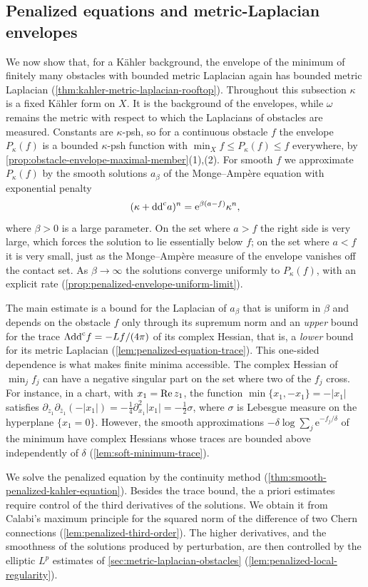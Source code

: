 \subsection{Penalized equations and metric-Laplacian envelopes}
\label{sec:penalized-kahler-envelopes}
We now show that, for a K\"ahler background, the envelope of the minimum of finitely many obstacles with bounded metric Laplacian again has bounded metric Laplacian (\cref{thm:kahler-metric-laplacian-rooftop}). Throughout this subsection $\kappa$ is a fixed K\"ahler form on $X$. It is the background of the envelopes, while $\omega$ remains the metric with respect to which the Laplacians of obstacles are measured. Constants are $\kappa$-psh, so for a continuous obstacle $f$ the envelope $P_\kappa(f)$ is a bounded $\kappa$-psh function with $\min_Xf\leq P_\kappa(f)\leq f$ everywhere, by \cref{prop:obstacle-envelope-maximal-member}(1),(2). For smooth $f$ we approximate $P_\kappa(f)$ by the smooth solutions $a_\beta$ of the Monge--Amp\`ere equation with exponential penalty
\[
 (\kappa+\mathrm{dd}^{\mathrm{c}} a)^n=\mathrm e^{\beta(a-f)}\kappa^n,
\]
where $\beta>0$ is a large parameter. On the set where $a>f$ the right side is very large, which forces the solution to lie essentially below $f$; on the set where $a<f$ it is very small, just as the Monge--Amp\`ere measure of the envelope vanishes off the contact set. As $\beta\to\infty$ the solutions converge uniformly to $P_\kappa(f)$, with an explicit rate (\cref{prop:penalized-envelope-uniform-limit}).

The main estimate is a bound for the Laplacian of $a_\beta$ that is uniform in $\beta$ and depends on the obstacle $f$ only through its supremum norm and an \emph{upper} bound for the trace $\Lambda\mathrm{dd}^{\mathrm{c}} f=-Lf/(4\pi)$ of its complex Hessian, that is, a \emph{lower} bound for its metric Laplacian (\cref{lem:penalized-equation-trace}). This one-sided dependence is what makes finite minima accessible. The complex Hessian of $\min_jf_j$ can have a negative singular part on the set where two of the $f_j$ cross. For instance, in a chart, with $x_1=\operatorname{Re} z_1$, the function $\min\{x_1,-x_1\}=-|x_1|$ satisfies $\partial_{z_1}\partial_{\bar z_1}(-|x_1|)=-\frac14\partial_{x_1}^2|x_1|=-\frac12\sigma$, where $\sigma$ is Lebesgue measure on the hyperplane $\{x_1=0\}$. However, the smooth approximations $-\delta\log\sum_j\mathrm e^{-f_j/\delta}$ of the minimum have complex Hessians whose traces are bounded above independently of $\delta$ (\cref{lem:soft-minimum-trace}).

We solve the penalized equation by the continuity method (\cref{thm:smooth-penalized-kahler-equation}). Besides the trace bound, the a priori estimates require control of the third derivatives of the solutions. We obtain it from Calabi's maximum principle for the squared norm of the difference of two Chern connections (\cref{lem:penalized-third-order}). The higher derivatives, and the smoothness of the solutions produced by perturbation, are then controlled by the elliptic $L^p$ estimates of \cref{sec:metric-laplacian-obstacles} (\cref{lem:penalized-local-regularity}).

